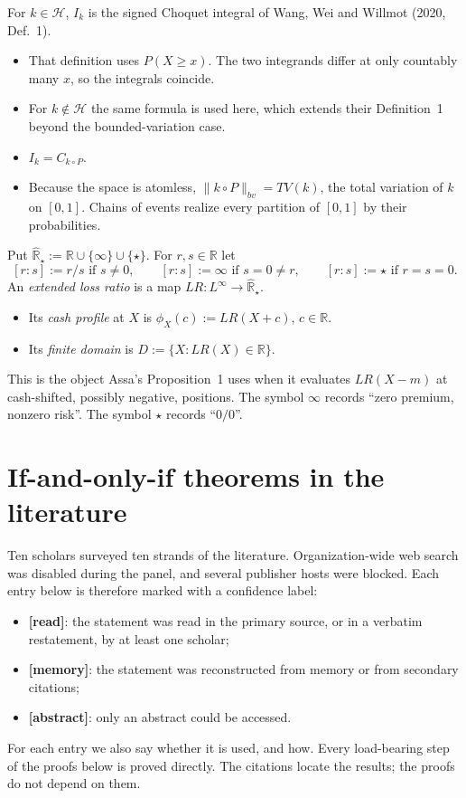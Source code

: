\begin{remark}
For $k\in\mathcal H$, $I_k$ is the signed Choquet integral of Wang, Wei and Willmot (2020, Def.~1).
\begin{itemize}
\item That definition uses $P(X\ge x)$. The two integrands differ at only countably many $x$, so the integrals coincide.
\item For $k\notin\mathcal H$ the same formula is used here, which extends their Definition~1 beyond the bounded-variation case.
\item $I_k=C_{k\circ P}$.
\item Because the space is atomless, $\|k\circ P\|_{bv}=TV(k)$, the total variation of $k$ on $[0,1]$. Chains of events realize every partition of $[0,1]$ by their probabilities.
\end{itemize}
\end{remark}

\begin{definition}
Put $\widehat{\mathbb R}_\star:=\mathbb R\cup\{\infty\}\cup\{\star\}$. For $r,s\in\mathbb R$ let
\[
[r:s]:=r/s \text{ if } s\neq 0,\qquad [r:s]:=\infty \text{ if } s=0\ne r,\qquad [r:s]:=\star \text{ if } r=s=0 .
\]
An \emph{extended loss ratio} is a map $LR:L^\infty\to\widehat{\mathbb R}_\star$.
\begin{itemize}
\item Its \emph{cash profile} at $X$ is $\phi_X(c):=LR(X+c)$, $c\in\mathbb R$.
\item Its \emph{finite domain} is $D:=\{X:LR(X)\in\mathbb R\}$.
\end{itemize}
This is the object Assa's Proposition~1 uses when it evaluates $LR(X-m)$ at cash-shifted, possibly negative, positions. The symbol $\infty$ records ``zero premium, nonzero risk''. The symbol $\star$ records ``$0/0$''.
\end{definition}

\section{If-and-only-if theorems in the literature}

Ten scholars surveyed ten strands of the literature. Organization-wide web search was disabled during the panel, and several publisher hosts were blocked. Each entry below is therefore marked with a confidence label:
\begin{itemize}
\item \textbf{[read]}: the statement was read in the primary source, or in a verbatim restatement, by at least one scholar;
\item \textbf{[memory]}: the statement was reconstructed from memory or from secondary citations;
\item \textbf{[abstract]}: only an abstract could be accessed.
\end{itemize}
For each entry we also say whether it is used, and how. Every load-bearing step of the proofs below is proved directly. The citations locate the results; the proofs do not depend on them.

